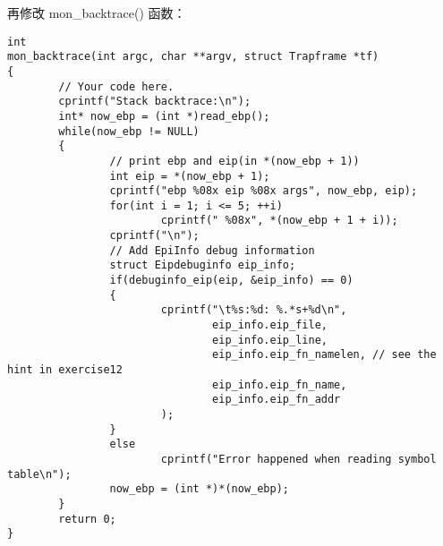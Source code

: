 \documentclass[12pt, letterpaper]{report}
\begin{document}
再修改 mon\_backtrace() 函数：
\lstset{style=CStyle}
\setmainfont{Consolas}
\begin{lstlisting}
int
mon_backtrace(int argc, char **argv, struct Trapframe *tf)
{
        // Your code here.
        cprintf("Stack backtrace:\n");
        int* now_ebp = (int *)read_ebp();
        while(now_ebp != NULL)
        {
                // print ebp and eip(in *(now_ebp + 1))
                int eip = *(now_ebp + 1);
                cprintf("ebp %08x eip %08x args", now_ebp, eip);
                for(int i = 1; i <= 5; ++i)
                        cprintf(" %08x", *(now_ebp + 1 + i));
                cprintf("\n");
                // Add EpiInfo debug information
                struct Eipdebuginfo eip_info;
                if(debuginfo_eip(eip, &eip_info) == 0)
                {
                        cprintf("\t%s:%d: %.*s+%d\n", 
                                eip_info.eip_file,
                                eip_info.eip_line,
                                eip_info.eip_fn_namelen, // see the hint in exercise12
                                eip_info.eip_fn_name,
                                eip_info.eip_fn_addr
                        );
                }
                else
                        cprintf("Error happened when reading symbol table\n");
                now_ebp = (int *)*(now_ebp);
        }
        return 0;
}
\end{lstlisting}
\setmainfont{Times New Roman}
\end{document}
